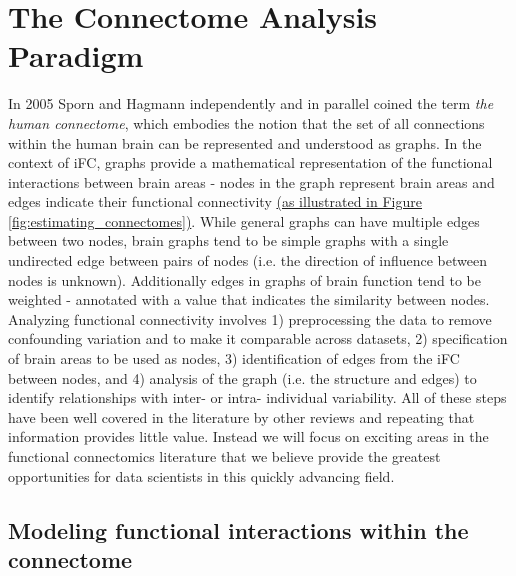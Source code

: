 \documentclass{bmcart}
\newcommand{\ADDED}[1]{\textcolor{markercolor}{\uline{#1}}}
\begin{document}
\section{The Connectome Analysis Paradigm}

In 2005 Sporn and Hagmann \cite{Sporns2005,Hagmann2005} independently and in parallel coined the term \textit{the human connectome}, which embodies the notion that the set of all connections within the human brain can be represented and understood as graphs. In the context of iFC, graphs provide a mathematical representation of the functional interactions between brain areas -  nodes in the graph represent brain areas and edges indicate their functional connectivity \ADDED{(as illustrated in Figure \ref{fig:estimating_connectomes})}. While general graphs can have multiple edges between two nodes, brain graphs tend to be simple graphs with a single undirected edge between pairs of nodes (i.e. the direction of influence between nodes is unknown). Additionally edges in graphs of brain function tend to be weighted - annotated with a value that indicates the similarity between nodes. Analyzing functional connectivity involves 1) preprocessing the data to remove confounding variation and to make it comparable across datasets, 2) specification of brain areas to be used as nodes, 3) identification of edges from the iFC between nodes, and 4) analysis of the graph (i.e. the structure and edges) to identify relationships with inter- or intra- individual variability. All of these steps have been well covered in the literature by other reviews \cite{Craddock2013,Kelly2012,Varoquaux2013} and repeating that information provides little value. Instead we will focus on exciting areas in the functional connectomics literature that we believe provide the greatest opportunities for data scientists in this quickly advancing field.

\subsection{Modeling functional interactions within the connectome}
\end{document}
